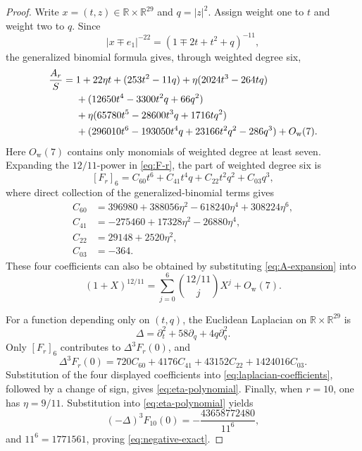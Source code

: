 \documentclass[11pt,reqno]{amsart}
\theoremstyle{remark}
\newcommand{\R}{\mathbb{R}}
\begin{document}
\begin{proof}
Write \(x=(t,z)\in\R\times\R^{29}\) and \(q=|z|^2\).  Assign weight
one to \(t\) and weight two to \(q\).  Since
\[
 |x\mp e_1|^{-22}=(1\mp2t+t^2+q)^{-11},
\]
the generalized binomial formula gives, through weighted degree six,
\begin{align}
 \frac{A_r}{S}
 ={}&1+22\eta t+(253t^2-11q)
      +\eta(2024t^3-264tq)\notag\\
 &+(12650t^4-3300t^2q+66q^2)\notag\\
 &+\eta(65780t^5-28600t^3q+1716tq^2)\notag\\
 &+(296010t^6-193050t^4q+23166t^2q^2-286q^3)
 +O_{\mathrm w}(7).
 \label{eq:A-expansion}
\end{align}
Here \(O_{\mathrm w}(7)\) contains only monomials of weighted degree at
least seven.  Expanding the \(12/11\)-power in \eqref{eq:F-r}, the part
of weighted degree six is
\begin{equation}\label{eq:F-degree-six}
 [F_r]_6=C_{60}t^6+C_{41}t^4q+C_{22}t^2q^2+C_{03}q^3,
\end{equation}
where direct collection of the generalized-binomial terms gives
\begin{align*}
 C_{60}&=396980+388056\eta^2-618240\eta^4+308224\eta^6,\\
 C_{41}&=-275460+17328\eta^2-26880\eta^4,\\
 C_{22}&=29148+2520\eta^2,\\
 C_{03}&=-364.
\end{align*}
These four coefficients can also be obtained by substituting
\eqref{eq:A-expansion} into
\[
 (1+X)^{12/11}
 =\sum_{j=0}^{6}\binom{12/11}{j}X^j+O_{\mathrm w}(7).
\]

For a function depending only on \((t,q)\), the Euclidean Laplacian on
\(\R\times\R^{29}\) is
\begin{equation}\label{eq:radial-laplacian}
 \Delta=\partial_t^2+58\partial_q+4q\partial_q^2.
\end{equation}
Only \([F_r]_6\) contributes to \(\Delta^3F_r(0)\), and
\begin{equation}\label{eq:laplacian-coefficients}
 \Delta^3F_r(0)
 =720C_{60}+4176C_{41}+43152C_{22}+1424016C_{03}.
\end{equation}
Substitution of the four displayed coefficients into
\eqref{eq:laplacian-coefficients}, followed by a change of sign, gives
\eqref{eq:eta-polynomial}.  Finally, when \(r=10\), one has
\(\eta=9/11\).  Substitution into \eqref{eq:eta-polynomial} yields
\[
 (-\Delta)^3F_{10}(0)
 =-\frac{43658772480}{11^6},
\]
and \(11^6=1771561\), proving \eqref{eq:negative-exact}.
\end{proof}
\end{document}
